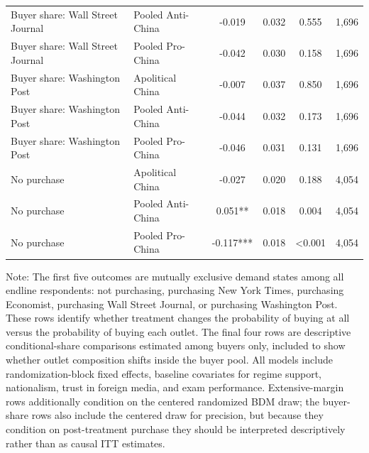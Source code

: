 \begin{table}[H]
\begin{threeparttable}
\begin{tabular}{llcccc}
Buyer share: Wall Street Journal & Pooled Anti-China & -0.019 & 0.032 & 0.555 & 1,696 \\
Buyer share: Wall Street Journal & Pooled Pro-China & -0.042 & 0.030 & 0.158 & 1,696 \\
Buyer share: Washington Post & Apolitical China & -0.007 & 0.037 & 0.850 & 1,696 \\
Buyer share: Washington Post & Pooled Anti-China & -0.044 & 0.032 & 0.173 & 1,696 \\
Buyer share: Washington Post & Pooled Pro-China & -0.046 & 0.031 & 0.131 & 1,696 \\
No purchase & Apolitical China & -0.027 & 0.020 & 0.188 & 4,054 \\
No purchase & Pooled Anti-China & 0.051** & 0.018 & 0.004 & 4,054 \\
No purchase & Pooled Pro-China & -0.117*** & 0.018 & <0.001 & 4,054 \\
\bottomrule
\end{tabular}
\begin{tablenotes}[flushleft]
\footnotesize
\item Note: The first five outcomes are mutually exclusive demand states among all endline respondents: not purchasing, purchasing New York Times, purchasing Economist, purchasing Wall Street Journal, or purchasing Washington Post. These rows identify whether treatment changes the probability of buying at all versus the probability of buying each outlet. The final four rows are descriptive conditional-share comparisons estimated among buyers only, included to show whether outlet composition shifts inside the buyer pool. All models include randomization-block fixed effects, baseline covariates for regime support, nationalism, trust in foreign media, and exam performance. Extensive-margin rows additionally condition on the centered randomized BDM draw; the buyer-share rows also include the centered draw for precision, but because they condition on post-treatment purchase they should be interpreted descriptively rather than as causal ITT estimates.
\end{tablenotes}
\end{threeparttable}
\end{table}
